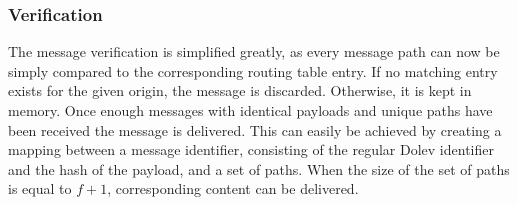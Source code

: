 



\subsubsection{Verification}


The message verification is simplified greatly, as every message path can now be simply compared to the corresponding routing table entry. If no matching entry exists for the given origin, the message is discarded. Otherwise, it is kept in memory. Once enough messages with identical payloads and unique paths have been received the message is delivered. This can easily be achieved by creating a mapping between a message identifier, consisting of the regular Dolev identifier and the hash of the payload, and a set of paths. When the size of the set of paths is equal to $f+1$, corresponding content can be delivered.


